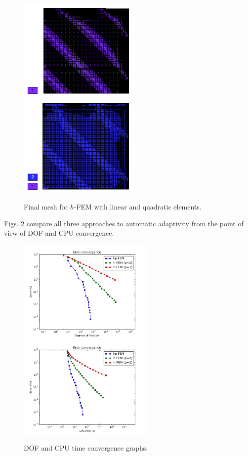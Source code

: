 \documentclass[12pt]{elsarticle}
\begin{document}
\begin{figure}[!ht]
\centering
\includegraphics[height=5cm]{nist/nist-6/mesh_h1_aniso.png}\ \
\includegraphics[height=5cm]{nist/nist-6/mesh_h2_aniso.png}
\caption{Final mesh for $h$-FEM with linear and quadratic elements.}
\label{fig:nist-6-h-aniso}
\end{figure}

Figs. \ref{fig:nist-6-conv} compare all
three approaches to automatic adaptivity from the point
of view of DOF and CPU convergence.

\begin{figure}[!ht]
\centering
\includegraphics[height=5cm]{nist/nist-6/conv_dof_aniso.png}\ \
\includegraphics[height=5cm]{nist/nist-6/conv_cpu_aniso.png}
\caption{DOF and CPU time convergence graphs.}
\label{fig:nist-6-conv}
\end{figure}
\end{document}
